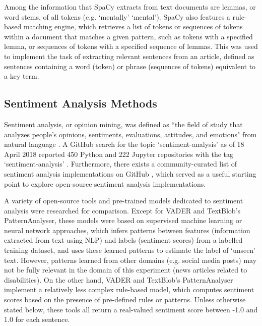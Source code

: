 \documentclass{report}
\begin{document}
Among the information that SpaCy extracts from text documents are lemmas, or word stems, of all tokens (e.g. `mentally' \textrightarrow\space `mental').
SpaCy also features a rule-based matching engine, which retrieves a list of tokens or sequences of tokens within a document that matches a given pattern, such as tokens with a specified lemma, or sequences of tokens with a specified sequence of lemmas.
This was used to implement the task of extracting relevant sentences from an article, defined as sentences containing a word (token) or phrase (sequences of tokens) equivalent to a key term.

\subsection{Sentiment Analysis Methods} \label{tc-sentiment}
Sentiment analysis, or opinion mining, was defined as ``the field of study that analyzes people's opinions, sentiments, evaluations, attitudes, and emotions" from natural language \cite{liu2012sentiment}.
A GitHub search for the topic `sentiment-analysis' as of 18 April 2018 reported 450 Python and 222 Jupyter repositories with the tag `sentiment-analysis' \cite{GitHub-sentiment-analysis}.
Furthermore, there exists a community-curated list of sentiment analysis implementations on GitHub \cite{awesome-sentiment-analysis}, which served as a useful starting point to explore open-source sentiment analysis implementations.

A variety of open-source tools and pre-trained models dedicated to sentiment analysis were researched for comparison.
Except for VADER and TextBlob's PatternAnalyser, these models were based on supervised machine learning or neural network approaches, which infers patterns between features (information extracted from text using NLP) and labels (sentiment scores) from a labelled training dataset, and uses these learned patterns to estimate the label of `unseen' text.
However, patterns learned from other domains (e.g. social media posts) may not be fully relevant in the domain of this experiment (news articles related to disabilities).
On the other hand, VADER and TextBlob's PatternAnalyser implement a relatively less complex rule-based model, which computes sentiment scores based on the presence of pre-defined rules or patterns.
Unless otherwise stated below, these tools all return a real-valued sentiment score between -1.0 and 1.0 for each sentence.
\end{document}
